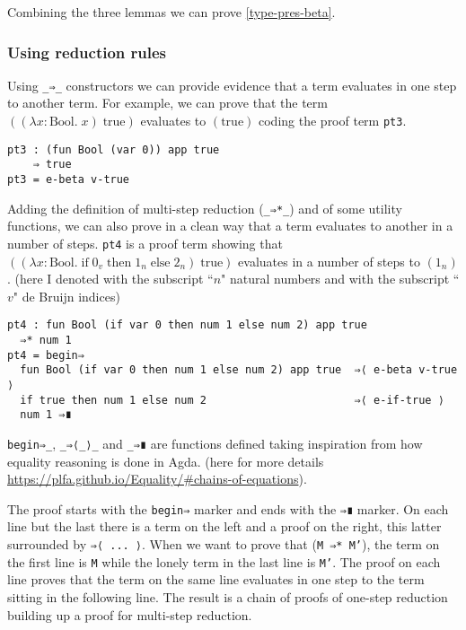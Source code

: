 \documentclass{article}
\begin{document}
Combining the three lemmas we can prove \ref{type-pres-beta}.


\subsubsection{Using reduction rules}

Using \texttt{\_⇒\_} constructors we can provide evidence that a term evaluates in one step to another term.
For example, we can prove that the term $((\lambda x:\text{Bool}. \; x) \; \text{true})$ evaluates to $(\text{true})$ coding the proof term \texttt{pt3}.

\begin{verbatim}
pt3 : (fun Bool (var 0)) app true
    ⇒ true
pt3 = e-beta v-true
\end{verbatim}

Adding the definition of multi-step reduction (\texttt{\_⇒*\_}) and of some utility functions, we can also prove in a clean way that a term evaluates to another in a number of steps.
\texttt{pt4} is a proof term showing that $((\lambda x:\text{Bool}. \; \text{if} \; 0_v \; \text{then} \; 1_n \; \text{else} \; 2_n) \; \text{true})$ evaluates in a number of steps to $(1_n)$. (here I denoted with the subscript ``$n$" natural numbers and with the subscript ``$v$" de Bruijn indices)

\begin{verbatim}
pt4 : fun Bool (if var 0 then num 1 else num 2) app true
  ⇒* num 1
pt4 = begin⇒
  fun Bool (if var 0 then num 1 else num 2) app true  ⇒⟨ e-beta v-true ⟩
  if true then num 1 else num 2                       ⇒⟨ e-if-true ⟩
  num 1 ⇒∎
\end{verbatim}

\texttt{begin⇒\_}, \texttt{\_⇒⟨\_⟩\_} and \texttt{\_⇒∎} are functions defined taking inspiration from how equality reasoning is done in Agda.
(here for more details \url{https://plfa.github.io/Equality/#chains-of-equations}).

The proof starts with the \texttt{begin⇒} marker and ends with the \texttt{⇒∎}  marker.
On each line but the last there is a term on the left and a proof on the right, this latter surrounded by \texttt{⇒⟨ ... ⟩}.
When we want to prove that (\texttt{M ⇒* M'}), the term on the first line is \texttt{M} while the lonely term in the last line is \texttt{M'}.
The proof on each line proves that the term on the same line evaluates in one step to the term sitting in the following line.
The result is a chain of proofs of one-step reduction building up a proof for multi-step reduction.
\end{document}
